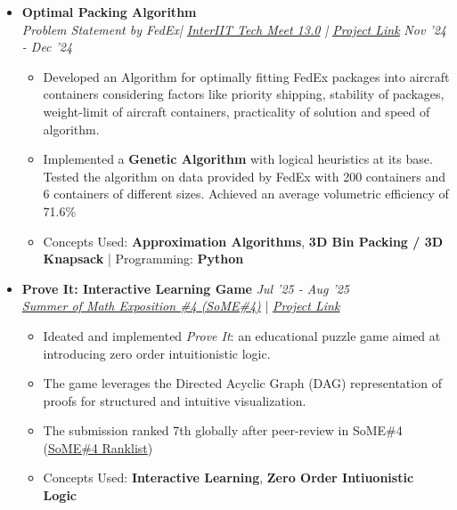 \documentclass[a4paper,10pt]{article}
\newcommand{\isep}{-2 pt}
\newcommand{\resheading}[1]{{\small \colorbox{mygrey}{\begin{minipage}{0.965\textwidth}{\textbf{#1 \vphantom{p\^{E}}}}\end{minipage}}}}
\begin{document}
\indent\resheading{\textbf{PROJECTS} }
\vspace{-0.45cm}
\begin{itemize}\itemsep \isep
    
    \item \textbf{Optimal Packing Algorithm} \\ \emph{Problem Statement by FedEx|  \href{https://www.linkedin.com/company/13th-inter-iit-tech-meet/} {InterIIT Tech Meet 13.0}  |  \href{https://github.com/IdkRandomTry/FedEx-PS-InterIIT-24-}{\underline{Project Link}}}  \hfill \emph{Nov '24 - Dec '24} \\[-0.6cm]
    \begin{itemize}\itemsep \isep
         \item Developed an Algorithm for optimally fitting FedEx packages into aircraft containers considering factors like priority shipping, stability of packages, weight-limit of aircraft containers, practicality of solution and speed of algorithm. 
        \item Implemented a \textbf{Genetic Algorithm} with logical heuristics at its base. Tested the algorithm on data provided by FedEx with 200 containers and 6 containers of different sizes. Achieved an average volumetric efficiency of 71.6\%
        \item Concepts Used: \textbf{Approximation Algorithms}, \textbf{3D Bin Packing / 3D Knapsack} | Programming: \textbf{Python}
    \end{itemize}

    \item \textbf{Prove It: Interactive Learning Game}  \hfill \emph{Jul '25 - Aug '25}\\\emph{{\href{https://some.3b1b.co/}{Summer of Math Exposition \#4 (SoME\#4)} }} |  \href{https://voxelrifts.itch.io/proveit} {\emph{\underline{Project Link}}}\\[-0.6cm]
    \begin{itemize}\itemsep \isep
        \item Ideated and implemented\textit{ Prove It}: an educational puzzle game aimed at introducing zero order intuitionistic logic. 
        \item The game leverages the Directed Acyclic Graph (DAG) representation of proofs for structured and intuitive visualization.
        \item The submission ranked 7th globally after peer-review in SoME\#4 (\href{https://some.3b1b.co/archive?category=non-video&year=2025&page=1}{SoME\#4 Ranklist})
        \item Concepts Used: \textbf{Interactive Learning}, \textbf{Zero Order Intiuonistic Logic}
    \end{itemize}


\end{itemize}
\end{document}
